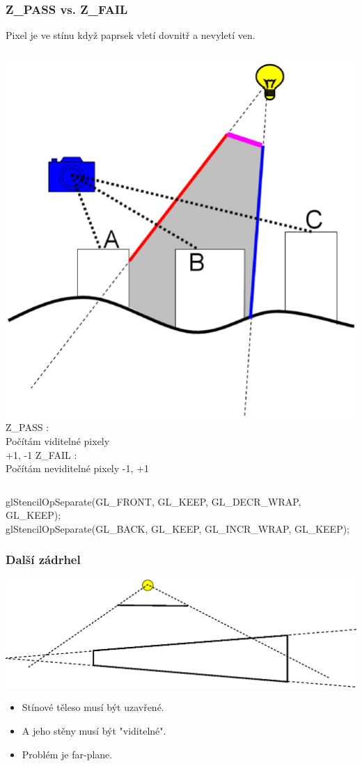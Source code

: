 \begin{frame}
    \frametitle{Z\_PASS vs. Z\_FAIL}
    Pixel je ve stínu když paprsek vletí {\color{red}dovnitř} a nevyletí {\color{blue}ven}.
    \begin{columns}[c]
        \includegraphics[width=\textwidth]{pics/shadows/shadowVolumes/ShadowVolume.eps}
        Z\_PASS : \\
        Počítám viditelné pixely \\
        {\color{red} +1}, {\color{blue} -1}
        \vfill
        Z\_FAIL : \\
        Počítám neviditelné pixely
        {\color{red} -1}, {\color{blue} +1}
    \end{columns}
    \pause\vfill
    glStencilOpSeparate(GL\_FRONT, GL\_KEEP, GL\_DECR\_WRAP, GL\_KEEP);\\
    glStencilOpSeparate(GL\_BACK, GL\_KEEP, GL\_INCR\_WRAP, GL\_KEEP);    
\end{frame}

\begin{frame}
    \frametitle{Další zádrhel}
    \includegraphics[width=\textwidth]{pics/shadows/shadowVolumes/svol-cap.eps}
    \begin{itemize}
        \item Stínové těleso musí být uzavřené.
        \item A jeho stěny musí být "viditelné".
        \item Problém je far-plane.
    \end{itemize}
\end{frame}

